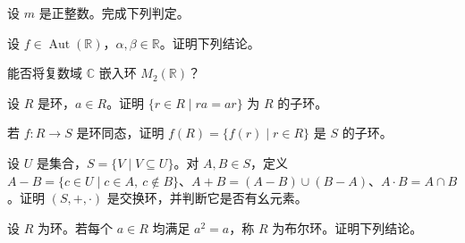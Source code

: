 \noindent\begin{minipage}{\textwidth}
设 $m$ 是正整数。完成下列判定。
\end{minipage}\par\vfill
\noindent\begin{minipage}{\textwidth}
设 $f\in\operatorname{Aut}(\mathbb{R})$，$\alpha,\beta\in\mathbb{R}$。证明下列结论。
\end{minipage}\par\vfill
\newpage
\noindent\begin{minipage}{\textwidth}
能否将复数域 $\mathbb{C}$ 嵌入环 $M_2(\mathbb{R})$？
\end{minipage}\par\vfill
\noindent\begin{minipage}{\textwidth}
设 $R$ 是环，$a\in R$。证明 $\{r\in R\mid ra=ar\}$ 为 $R$ 的子环。
\end{minipage}\par\vfill
\noindent\begin{minipage}{\textwidth}
若 $f\colon R\to S$ 是环同态，证明 $f(R)=\{f(r)\mid r\in R\}$ 是 $S$ 的子环。
\end{minipage}\par\vfill
\newpage
\noindent\begin{minipage}{\textwidth}
设 $U$ 是集合，$S=\{V\mid V\subseteq U\}$。对 $A,B\in S$，定义 $A-B=\{c\in U\mid c\in A,\ c\notin B\}$、$A+B=(A-B)\cup(B-A)$、$A\cdot B=A\cap B$。证明 $(S,+,\cdot)$ 是交换环，并判断它是否有幺元素。
\end{minipage}\par\vfill
\noindent\begin{minipage}{\textwidth}
设 $R$ 为环。若每个 $a\in R$ 均满足 $a^2=a$，称 $R$ 为布尔环。证明下列结论。
\end{minipage}\par\vfill
